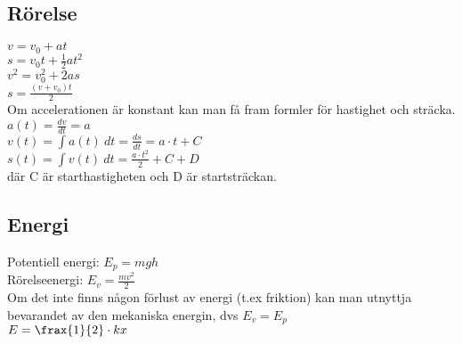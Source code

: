 \subsection{Rörelse}
    \begin{math}
        v = v_0 + at
    \end{math} \\[2pt]
    \begin{math}
        s = v_0 t + \frac{1}{2} at^2
    \end{math} \\[2pt]
    \begin{math}
        v^2 = v_0^2 + 2as
    \end{math} \\[2pt]
    \begin{math}
        s = \frac{(v + v_0)t}{2}
    \end{math} \\[2pt]
    Om accelerationen är konstant kan man få fram formler för hastighet och sträcka. \\
    \begin{math}
        a(t) = \frac{dv}{dt} = a
    \end{math} \\[2pt]
    \begin{math}
        v(t) = \int a(t) \ dt = \frac{ds}{dt} = a \cdot t + C
    \end{math} \\[2pt]
    \begin{math}
        s(t) = \int v(t) \ dt = \frac{a \cdot t^2}{2} + C + D
    \end{math} \\[2pt]
    där C är starthastigheten och D är startsträckan.

\subsection{Energi}
Potentiell energi:
\begin{math}
    E_p = mgh
\end{math} \\[2pt]
Rörelseenergi:
\begin{math}
    E_v = \frac{mv^2}{2}
\end{math} \\[2pt]
Om det inte finns någon förlust av energi (t.ex friktion) kan man utnyttja bevarandet av den mekaniska energin, dvs 
\begin{math}
    E_v = E_p
\end{math} \\[2pt]
\begin{math}
    E = \frax{1}{2} \cdot kx
\end{math} \\[2pt]

